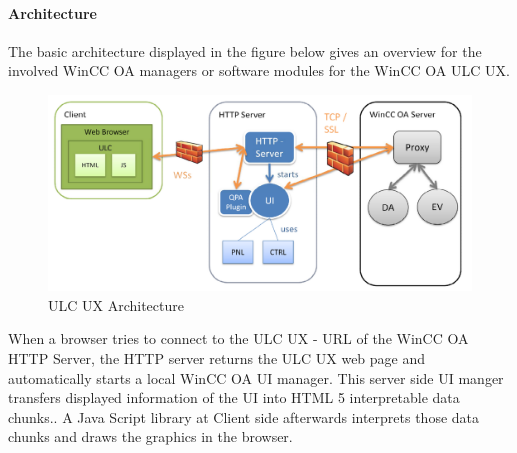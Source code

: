\documentclass[a4paper, 12pt]{article}
\begin{document}
\paragraph{Architecture}
The basic architecture displayed in the figure below gives an overview for the involved WinCC OA managers or software modules for the WinCC OA ULC UX.
\begin{figure}[!h]
    \centering
    \includegraphics[scale = 0.4]{images/ulc_ux_architecture.png}
    \caption{ULC UX Architecture}
\end{figure}\newline
When a browser tries to connect to the ULC UX - URL of the WinCC OA HTTP Server, the HTTP server returns the ULC UX web page and automatically starts a local WinCC OA UI manager. This server side UI manger transfers displayed information of the UI into HTML 5 interpretable data chunks.. A Java Script library at Client side afterwards interprets those data chunks and draws the graphics in the browser.

\clearpage
\glsaddall
\printglossaries
\end{document}
